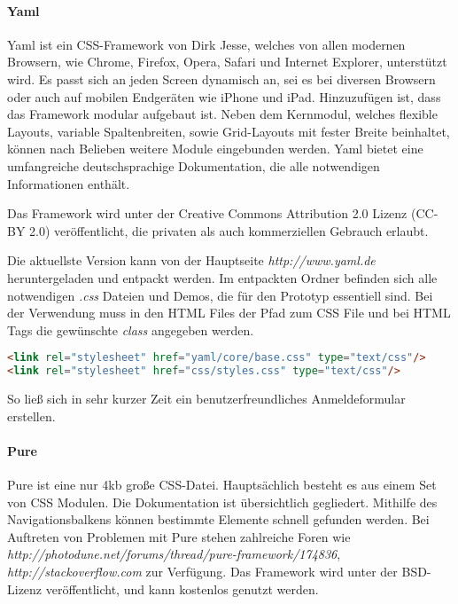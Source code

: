 \newpage

\paragraph{Yaml}
Yaml ist ein CSS-Framework von Dirk Jesse, welches von allen modernen Browsern, wie Chrome, Firefox, Opera, Safari und Internet Explorer, unterstützt wird. Es passt sich an jeden Screen dynamisch an, sei es bei diversen Browsern oder auch auf mobilen Endgeräten wie iPhone und iPad. Hinzuzufügen ist, dass das Framework modular aufgebaut ist. Neben dem Kernmodul, welches flexible Layouts, variable Spaltenbreiten, sowie Grid-Layouts mit fester Breite beinhaltet, können nach Belieben weitere Module eingebunden werden. Yaml bietet eine umfangreiche deutschsprachige Dokumentation, die alle notwendigen Informationen enthält. \cite{YAML}

Das Framework wird unter der Creative Commons Attribution 2.0 Lizenz (CC-BY 2.0) veröffentlicht, die privaten als auch kommerziellen Gebrauch erlaubt. \cite{CCBY}

Die aktuellste Version kann von der Hauptseite \textit{http://www.yaml.de} heruntergeladen und entpackt werden. Im entpackten Ordner befinden sich alle notwendigen \textit{.css} Dateien und Demos, die für den Prototyp essentiell sind. Bei der Verwendung muss in den HTML Files der Pfad zum CSS File und bei HTML Tags die gewünschte \textit{class} angegeben werden. 
\begin{lstlisting}[caption={YAML einbinden \cite{YAMLPROTO}}, language=HTML]
<link rel="stylesheet" href="yaml/core/base.css" type="text/css"/>
<link rel="stylesheet" href="css/styles.css" type="text/css"/>
\end{lstlisting}

So ließ sich in sehr kurzer Zeit ein benutzerfreundliches Anmeldeformular erstellen.

\paragraph{Pure}
Pure ist eine nur 4kb große CSS-Datei. Hauptsächlich besteht es aus einem Set von CSS Modulen. Die Dokumentation ist übersichtlich gegliedert. Mithilfe des Navigationsbalkens können bestimmte Elemente schnell gefunden werden. Bei Auftreten von Problemen mit Pure stehen zahlreiche Foren wie \textit{http://photodune.net/forums/thread/pure-framework/174836}, \textit{http://stackoverflow.com} zur Verfügung. Das Framework wird unter der BSD-Lizenz veröffentlicht, und kann kostenlos genutzt werden. \cite{BSD}

